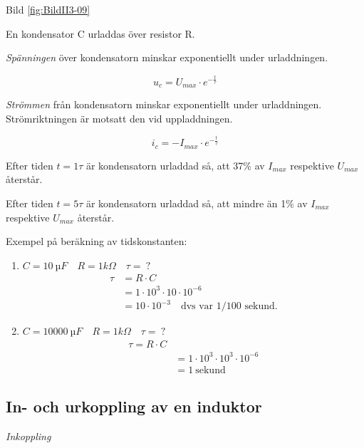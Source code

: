 Bild \ref{fig:BildII3-09}

En kondensator C urladdas över resistor R.

\emph{Spänningen} över kondensatorn minskar exponentiellt under urladdningen.

\[u_c = U_{max} \cdot e^{-\frac{t}{\tau}}\]

\emph{Strömmen} från kondensatorn minskar exponentiellt under urladdningen.
Strömriktningen är motsatt den vid uppladdningen.

\[i_c = - I_{max} \cdot e^{-\frac{t}{\tau}}\]

Efter tiden \(t = 1\tau\) är kondensatorn urladdad så, att 37\% av \(I_{max}\)
respektive \(U_{max}\) återstår.

Efter tiden \(t = 5\tau\) är kondensatorn urladdad så, att mindre än 1\% av
\(I_{max}\) respektive \(U_{max}\) återstår.

Exempel på beräkning av tidskonstanten:
\begin{enumerate}
\item \(C = 10\ µF \quad R = 1 kΩ \quad \tau =\ ?\)
  \begin{align*}
    \tau &= R \cdot C \\
    &= 1 \cdot 10^3 \cdot 10 \cdot 10^{-6} \\
    &= 10 \cdot 10^{-3} \quad \text{dvs var 1/100 sekund.}
  \end{align*}
\item \(C = 10000\ µF \quad R = 1 kΩ \quad \tau =\ ?\)
  \begin{align*}
    \tau = R \cdot C \\
    &= 1 \cdot 10^3 \cdot 10^3 \cdot 10^{-6} \\
    &= 1\ \text{sekund}
  \end{align*}
\end{enumerate}

\subsection{In- och urkoppling av en induktor}

\emph{Inkoppling}

